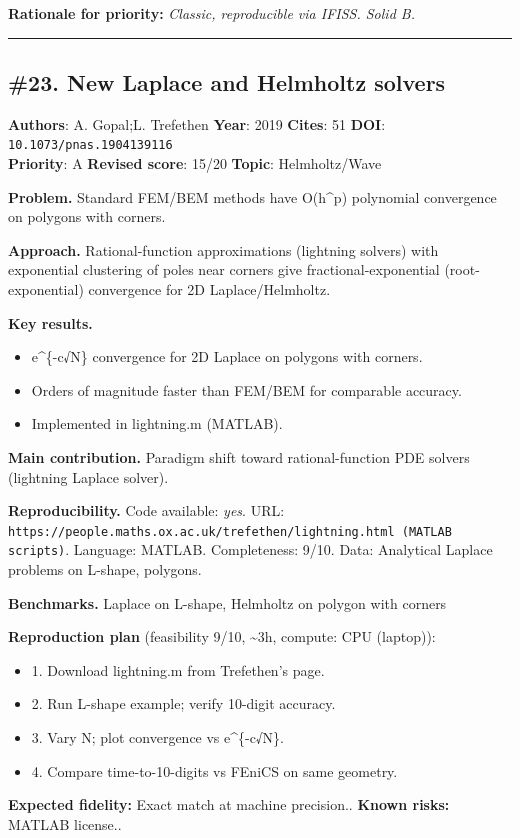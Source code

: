 \documentclass[10pt,letterpaper]{article}
\begin{document}
\textbf{Rationale for priority:} \emph{Classic, reproducible via IFISS. Solid B.}

\medskip\hrule\medskip

\subsection*{\#23. New Laplace and Helmholtz solvers}
\textbf{Authors}: A. Gopal;L. Trefethen \textbullet{} \textbf{Year}: 2019 \textbullet{} \textbf{Cites}: 51 \textbullet{} \textbf{DOI}: \texttt{10.1073/pnas.1904139116} \\
\textbf{Priority}: A \textbullet{} \textbf{Revised score}: 15/20 \textbullet{} \textbf{Topic}: Helmholtz/Wave

\textbf{Problem.} Standard FEM/BEM methods have O(h\^{}p) polynomial convergence on polygons with corners.

\textbf{Approach.} Rational-function approximations (lightning solvers) with exponential clustering of poles near corners give fractional-exponential (root-exponential) convergence for 2D Laplace/Helmholtz.

\textbf{Key results.}
\begin{itemize}
\item e\^{}\{-c√N\} convergence for 2D Laplace on polygons with corners.
\item Orders of magnitude faster than FEM/BEM for comparable accuracy.
\item Implemented in lightning.m (MATLAB).
\end{itemize}

\textbf{Main contribution.} Paradigm shift toward rational-function PDE solvers (lightning Laplace solver).

\textbf{Reproducibility.} Code available: \emph{yes}. URL: \texttt{https://people.maths.ox.ac.uk/trefethen/lightning.html (MATLAB scripts)}. Language: MATLAB. Completeness: 9/10. Data: Analytical Laplace problems on L-shape, polygons.

\textbf{Benchmarks.} Laplace on L-shape, Helmholtz on polygon with corners

\textbf{Reproduction plan} (feasibility 9/10, \textasciitilde3h, compute: CPU (laptop)):
\begin{itemize}
\item 1. Download lightning.m from Trefethen's page.
\item 2. Run L-shape example; verify 10-digit accuracy.
\item 3. Vary N; plot convergence vs e\^{}\{-c√N\}.
\item 4. Compare time-to-10-digits vs FEniCS on same geometry.
\end{itemize}
\textbf{Expected fidelity:} Exact match at machine precision.. \textbf{Known risks:} MATLAB license..
\end{document}
